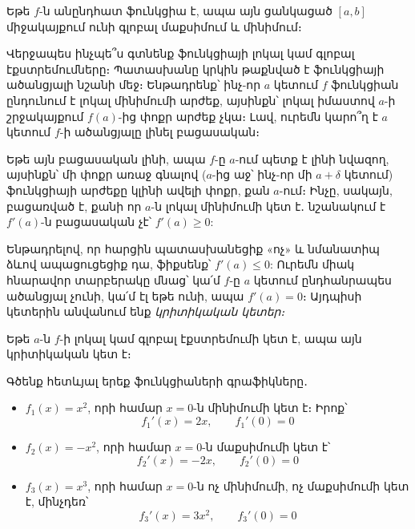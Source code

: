 \begin{theorem}
Եթե $f$-ն անընդհատ ֆունկցիա է, ապա այն ցանկա\-ցած $[a, b]$ միջակայքում ունի գլոբալ մաքսիմում և մինիմում։
\end{theorem}

Վերջապես ինչպե՞ս գտնենք ֆունկցիայի լոկալ կամ գլոբալ էքստրեմում\-ները։ Պատասխանը կրկին թաքնված է ֆունկցիայի ածանցյալի նշանի մեջ։ Ենթադրենք՝ ինչ-որ $a$ կետում $f$ ֆունկցիան ընդունում է լոկալ մինիմումի արժեք, այսինքն՝ լոկալ իմաստով $a$-ի շրջակայքում $f(a)$-ից փոքր արժեք չկա։ Լավ, ուրեմն կարո՞ղ է $a$ կետում $f$-ի ածանցյալը լինել բացասական։ 

\newpage

Եթե այն բացասական լինի, ապա $f$-ը $a$-ում պետք է լինի նվազող, այսինքն՝ մի փոքր առաջ գնալով ($a$-ից աջ՝ ինչ-որ մի $a+\delta$ կետում) ֆունկցիայի արժեքը կլինի ավելի փոքր, քան $a$-ում։ Ինչը, սակայն, բացառված է, քանի որ $a$-ն լոկալ մինիմումի կետ է․ նշանակում է $f'(a)$-ն բացասական չէ՝ $f'(a) \ge 0$: 


Ենթադրելով, որ հարցին պատասխանեցիք «ոչ» և նմանատիպ ձևով ապացուցեցիք դա, ֆիքսենք՝ $f'(a) \le 0$: Ուրեմն միակ հնարավոր տարբերակը մնաց՝ կա՛մ $f$-ը $a$ կետում ընդհանրապես ածանցյալ չունի, կա՛մ էլ եթե ունի, ապա $f'(a) = 0$։ Այդպիսի կետերին անվանում ենք \textit{կրիտիկական կետեր։}

\begin{theorem}
Եթե $a$-ն $f$-ի լոկալ կամ գլոբալ էքստրեմումի կետ է, ապա այն կրիտիկական կետ է։
\end{theorem}


\begin{example}
Գծենք հետևյալ երեք ֆունկցիաների գրաֆիկները․
\begin{itemize}
\item $f_1(x)=x^2$, որի համար $x=0$-ն մինիմումի կետ է։ Իրոք՝
\[ f_1'(x)=2x,\qquad f_1'(0)=0 \]

\item $f_2(x)=-x^2$, որի համար $x=0$-ն մաքսիմումի կետ է՝
\[ f_2'(x)=-2x,\qquad f_2'(0)=0 \]

\item $f_3(x)=x^3$, որի համար $x=0$-ն ոչ մինիմումի, ոչ մաքսիմումի կետ է, մինչդեռ՝
\[ f_3'(x)=3x^2,\qquad f_3'(0)=0 \]
\end{itemize}
\end{example}

